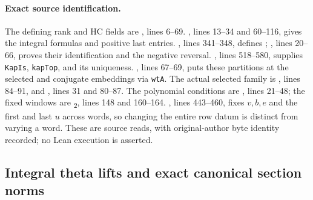 \documentclass[11pt,a4paper]{article}
\theoremstyle{definition}\newtheorem{remark}[theorem]{Remark}
\begin{document}
\paragraph{Exact source identification.}
The defining rank and HC fields are
, lines 6--69.
, lines 13--34 and 60--116, gives the integral
formulas and positive last entries.
, lines 341--348, defines
;
,
lines 20--66, proves their identification and the negative reversal.
, lines 518--580, supplies
\texttt{KapIs}, \texttt{kapTop}, and its uniqueness.
, lines 67--69,
puts these partitions at the selected and conjugate embeddings via
\texttt{wtA}. The actual selected family is
, lines 84--91, and
, lines 31 and 80--87.
The polynomial conditions are , lines 21--48;
the fixed windows are \textsubscript{2}, lines 148 and 160--164.
, lines 443--460, fixes
$v,b,e$ and the first and last $u$ across words, so changing the entire
row datum is distinct from varying a word.
These are source reads, with original-author byte identity recorded;
no Lean execution is asserted.


\subsection{Integral theta lifts and exact canonical section norms}
\end{document}
